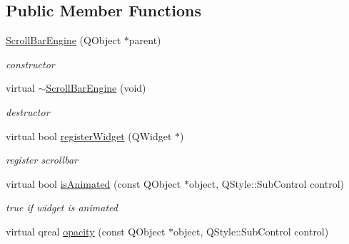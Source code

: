 \subsection*{Public Member Functions}
\begin{DoxyCompactItemize}
\item 
\mbox{\label{class_scroll_bar_engine_a7222ec00c7997400f14b8a2b991aedc9}} 
\hyperlink{class_scroll_bar_engine_a7222ec00c7997400f14b8a2b991aedc9}{Scroll\+Bar\+Engine} (Q\+Object $\ast$parent)
\begin{DoxyCompactList}\small\item\em constructor \end{DoxyCompactList}\item 
\mbox{\label{class_scroll_bar_engine_ac90439a1918e8a98537f1f626fbb5af9}} 
virtual \hyperlink{class_scroll_bar_engine_ac90439a1918e8a98537f1f626fbb5af9}{$\sim$\+Scroll\+Bar\+Engine} (void)
\begin{DoxyCompactList}\small\item\em destructor \end{DoxyCompactList}\item 
\mbox{\label{class_scroll_bar_engine_a99af25cf0ca2c050ef1f7e32f0292c24}} 
virtual bool \hyperlink{class_scroll_bar_engine_a99af25cf0ca2c050ef1f7e32f0292c24}{register\+Widget} (Q\+Widget $\ast$)
\begin{DoxyCompactList}\small\item\em register scrollbar \end{DoxyCompactList}\item 
\mbox{\label{class_scroll_bar_engine_a8fd83dda0e5287c031fb8e7ef1030d49}} 
virtual bool \hyperlink{class_scroll_bar_engine_a8fd83dda0e5287c031fb8e7ef1030d49}{is\+Animated} (const Q\+Object $\ast$object, Q\+Style\+::\+Sub\+Control control)
\begin{DoxyCompactList}\small\item\em true if widget is animated \end{DoxyCompactList}\item 
\mbox{\label{class_scroll_bar_engine_a7a171f146872ced0dcd42bc75d8b7118}} 
virtual qreal \hyperlink{class_scroll_bar_engine_a7a171f146872ced0dcd42bc75d8b7118}{opacity} (const Q\+Object $\ast$object, Q\+Style\+::\+Sub\+Control control)

\end{DoxyCompactItemize}
